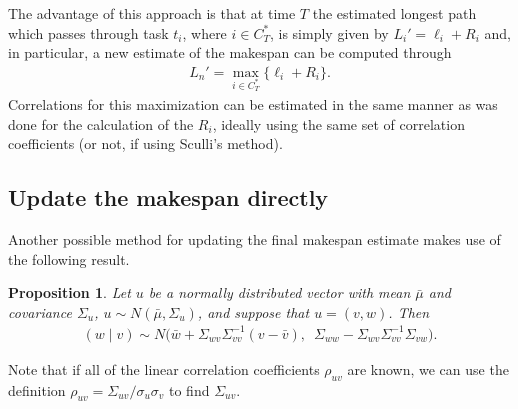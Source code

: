 \documentclass[12pt]{article}
\newtheorem{prop}[theorem]{Proposition}
\begin{document}
The advantage of this approach is that at time $T$ the estimated longest path which passes through task $t_i$, where $i \in C_T^*$, is simply given by $L_i' = \ell_i + R_i$ and, in particular, a new estimate of the makespan can be computed through
\begin{align*}
  L_n' = \max_{i \in C_T^*} \{ \ell_i + R_i  \}.
\end{align*}
Correlations for this maximization can be estimated in the same manner as was done for the calculation of the $R_i$, ideally using the same set of correlation coefficients (or not, if using Sculli's method).

\subsection{Update the makespan directly}
\label{subsect.corr_update}

Another possible method for updating the final makespan estimate makes use of the following result.
\begin{prop}
	Let $u$ be a normally distributed vector with mean $\bar{\mu}$ and covariance $\Sigma_u$, $u \sim N(\bar{\mu}, \Sigma_u)$, and suppose that $u = (v, w)$. Then 
	\begin{align*}
	(w \mid v) \sim N \big( \bar{w} + \Sigma_{wv}\Sigma_{vv}^{-1} (v - \bar{v}), \enspace  \Sigma_{ww} - \Sigma_{wv} \Sigma_{vv}^{-1} \Sigma_{vw} \big).
	\end{align*}
\end{prop}
Note that if all of the linear correlation coefficients $\rho_{uv}$ are known, we can use the definition $\rho_{uv} = \Sigma_{uv} / \sigma_u \sigma_v$ to find $\Sigma_{uv}$.
\end{document}
